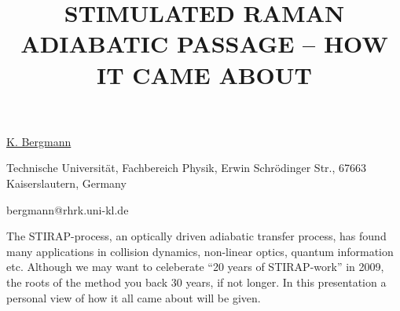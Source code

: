\title{STIMULATED RAMAN ADIABATIC PASSAGE -- HOW IT CAME ABOUT}

\underline{K. Bergmann} 

{\normalsize{\vspace{-4mm}
Technische Universit\"{a}t, Fachbereich Physik, Erwin Schr\"{o}dinger
Str., 67663 Kaiserslautern, Germany

\email bergmann@rhrk.uni-kl.de}}

The STIRAP-process, an optically driven adiabatic transfer process, has found many applications in collision dynamics, non-linear optics, quantum information etc. Although we may want to celeberate ``20 years of STIRAP-work'' in 2009, the roots of the method you back 30 years, if not longer. In this presentation a personal view of how it all came about will be given.

\vspace{\baselineskip}
